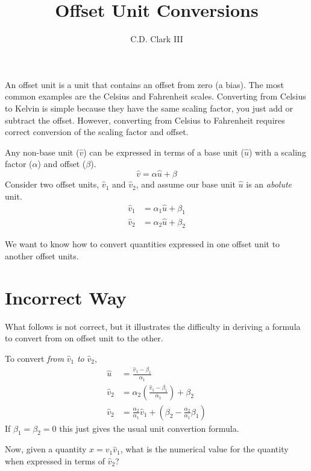\documentclass[letterpaper,10pt]{article}
\title{Offset Unit Conversions}
\author{C.D. Clark III}
\begin{document}
\maketitle

An offset unit is a unit that contains an offset from zero (a bias). The most common examples are the Celsius and Fahrenheit
scales. Converting from Celsius to Kelvin is simple because they have the same
scaling factor, you just add or subtract the offset. However, converting from
Celsius to Fahrenheit requires correct conversion of the scaling factor and offset.

Any non-base unit ($\hat{v}$) can be expressed in terms of a base unit ($\hat{u}$) with a scaling factor ($\alpha$) and offset ($\beta$).
$$
\label{eq:offset_unit}
\hat{v} = \alpha \hat{u} + \beta
$$
Consider two offset units, $\hat{v}_1$ and $\hat{v}_2$, and assume our base unit $\hat{u}$ is an \emph{abolute} unit.
\begin{align}
  \hat{v}_1 &= \alpha_1 \hat{u} + \beta_1 \\
  \hat{v}_2 &= \alpha_2 \hat{u} + \beta_2
\end{align}

We want to know how to convert quantities expressed in one offset unit to another offset units.

\section{Incorrect Way}
What follows is not correct, but it illustrates the difficulty in deriving a formula to convert from on offset unit to the other.

To convert \emph{from} $\hat{v}_1$ \emph{to} $\hat{v}_2$,
\begin{align}
  \hat{u} &= \frac{\hat{v}_1 - \beta_1}{\alpha_1} \\
  \hat{v}_2 &= \alpha_2 \left( \frac{\hat{v}_1 - \beta_1}{\alpha_1} \right)  + \beta_2 \\
  \label{eq:v1_to_v2}
  \hat{v}_2 &= \frac{\alpha_2}{\alpha_1}\hat{v}_1  + \left( \beta_2- \frac{\alpha_2}{\alpha_1}\beta_1 \right)
\end{align}
If $\beta_1 = \beta_2 = 0$ this just gives the usual unit convertion formula.

Now, given a quantity $x = v_1 \hat{v}_1$, what is the numerical value for the quantity when expressed in terms of $\hat{v}_2$?
\end{document}
